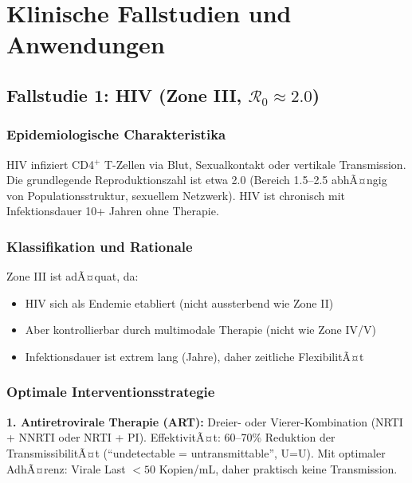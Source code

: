 ﻿\documentclass[a4paper,12pt,twoside]{article}
\theoremstyle{definition}
\begin{document}
\section{Klinische Fallstudien und Anwendungen}
\label{sec:applications}

\subsection{Fallstudie 1: HIV (Zone III, $\mathcal{R}_0 \approx 2.0$)}

\subsubsection{Epidemiologische Charakteristika}

HIV infiziert CD4$^+$ T-Zellen via Blut, Sexualkontakt oder vertikale Transmission. Die grundlegende Reproduktionszahl ist etwa 2.0 (Bereich 1.5--2.5 abhÃ¤ngig von Populationsstruktur, sexuellem Netzwerk). HIV ist chronisch mit Infektionsdauer 10+ Jahren ohne Therapie.

\subsubsection{Klassifikation und Rationale}

Zone III ist adÃ¤quat, da:
\begin{itemize}
\item HIV sich als Endemie etabliert (nicht aussterbend wie Zone II)
\item Aber kontrollierbar durch multimodale Therapie (nicht wie Zone IV/V)
\item Infektionsdauer ist extrem lang (Jahre), daher zeitliche FlexibilitÃ¤t
\end{itemize}

\subsubsection{Optimale Interventionsstrategie}

\textbf{1. Antiretrovirale Therapie (ART):} Dreier- oder Vierer-Kombination (NRTI + NNRTI oder NRTI + PI). EffektivitÃ¤t: 60--70\% Reduktion der TransmissibilitÃ¤t (``undetectable = untransmittable'', U=U). Mit optimaler AdhÃ¤renz: Virale Last $< 50$ Kopien/mL, daher praktisch keine Transmission.
\end{document}
